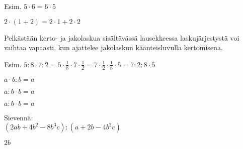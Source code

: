 Esim. $5 \cdot 6 = 6 \cdot 5$

$2 \cdot (1+2) = 2 \cdot 1 + 2 \cdot 2$


Pelkästään kerto- ja jakolaskua sisältävässä lausekkeessa laskujärjestystä voi vaihtaa vapaasti, kun ajattelee jakolaskun käänteisluvulla kertomisena.

Esim. $5:8\cdot 7:2=5\cdot\frac18\cdot 7\cdot\frac12=7\cdot \frac12\cdot\frac18\cdot 5=7:2:8\cdot 5$

$a\cdot b:b=a$

$a:b\cdot b=a$

$a:b\cdot b=a$

\begin{tehtava}
Sievennä: \\
$(2ab+4b^2-8b^3c):(a+2b-4b^2c)$
	\begin{vastaus}
	$2b$
	\end{vastaus}
\end{tehtava}